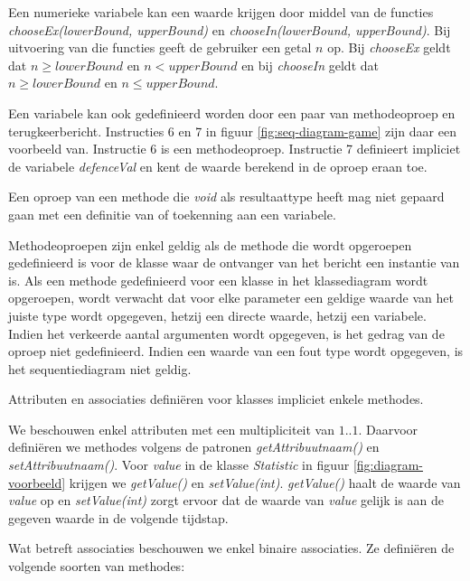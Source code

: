 Een numerieke variabele kan een waarde krijgen door middel van de functies \textit{chooseEx(lowerBound, upperBound)} en \textit{chooseIn(lowerBound, upperBound)}. Bij uitvoering van die functies geeft de gebruiker een getal $n$ op. Bij \textit{chooseEx} geldt dat $n \geq lowerBound$ en $n < upperBound$ en bij \textit{chooseIn} geldt dat $n \geq lowerBound$ en $n \leq upperBound$.

Een variabele kan ook gedefinieerd worden door een paar van methodeoproep en terugkeerbericht. Instructies 6 en 7 in figuur \ref{fig:seq-diagram-game} zijn daar een voorbeeld van. Instructie 6 is een methodeoproep. Instructie 7 definieert impliciet de variabele \textit{defenceVal} en kent de waarde berekend in de oproep eraan toe.

Een oproep van een methode die \textit{void} als resultaattype heeft mag niet gepaard gaan met een definitie van of toekenning aan een variabele.

Methodeoproepen zijn enkel geldig als de methode die wordt opgeroepen gedefinieerd is voor de klasse waar de ontvanger van het bericht een instantie van is. Als een methode gedefinieerd voor een klasse in het klassediagram wordt opgeroepen, wordt verwacht dat voor elke parameter een geldige waarde van het juiste type wordt opgegeven, hetzij een directe waarde, hetzij een variabele. Indien het verkeerde aantal argumenten wordt opgegeven, is het gedrag van de oproep niet gedefinieerd. Indien een waarde van een fout type wordt opgegeven, is het sequentiediagram niet geldig.

Attributen en associaties defini\"eren voor klasses impliciet enkele methodes. 

We beschouwen enkel attributen met een multipliciteit van $1..1$. Daarvoor defini\"eren we methodes volgens de patronen \textit{getAttribuutnaam()} en \textit{setAttribuutnaam()}. Voor \textit{value} in de klasse \textit{Statistic} in figuur \ref{fig:diagram-voorbeeld} krijgen we \textit{getValue()} en \textit{setValue(int)}. \textit{getValue()} haalt de waarde van \textit{value} op en \textit{setValue(int)} zorgt ervoor dat de waarde van \textit{value} gelijk is aan de gegeven waarde in de volgende tijdstap.

Wat betreft associaties beschouwen we enkel binaire associaties. Ze defini\"eren de volgende soorten van methodes:


